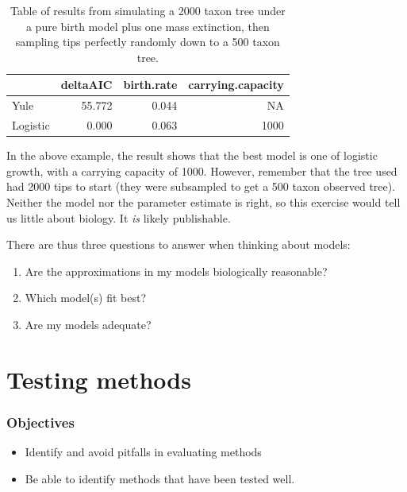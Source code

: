 \documentclass[]{article}
\providecommand{\tightlist}{%
  \setlength{\itemsep}{0pt}\setlength{\parskip}{0pt}}
\theoremstyle{definition}
\theoremstyle{definition}
\theoremstyle{definition}
\theoremstyle{remark}
\begin{document}
\begin{table}

\caption{\label{tab:unnamed-chunk-8}Table of results from simulating a 2000 taxon tree under a pure birth model plus one mass extinction, then sampling tips perfectly randomly down to a 500 taxon tree.}
\centering
\begin{tabular}[t]{l|r|r|r}
\hline
  & deltaAIC & birth.rate & carrying.capacity\\
\hline
Yule & 55.772 & 0.044 & NA\\
\hline
Logistic & 0.000 & 0.063 & 1000\\
\hline
\end{tabular}
\end{table}

In the above example, the result shows that the best model is one of
logistic growth, with a carrying capacity of 1000. However, remember
that the tree used had 2000 tips to start (they were subsampled to get a
500 taxon observed tree). Neither the model nor the parameter estimate
is right, so this exercise would tell us little about biology. It
\emph{is} likely publishable.

There are thus three questions to answer when thinking about models:

\begin{enumerate}
\def\labelenumi{\arabic{enumi})}
\tightlist
\item
  Are the approximations in my models biologically reasonable?
\item
  Which model(s) fit best?
\item
  Are my models adequate?
\end{enumerate}

\hypertarget{testing-methods}{%
\section{Testing methods}\label{testing-methods}}

\hypertarget{objectives-1}{%
\subsubsection{Objectives}\label{objectives-1}}

\begin{itemize}
\tightlist
\item
  Identify and avoid pitfalls in evaluating methods
\item
  Be able to identify methods that have been tested well.
\end{itemize}
\end{document}
